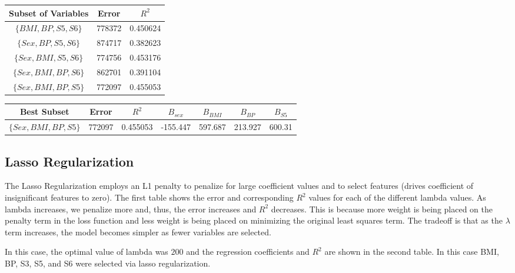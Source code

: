 \documentclass[15pt,a4paper,openright]{article}
\begin{document}
\begin{center}
 \begin{tabular}{||c | c | c||} 
 \hline
 Subset of Variables & Error & $R^2$  \\ [0.5ex] 
 \hline\hline
 $\{BMI, BP, S5, S6\}$ & 778372 & 0.450624   \\
 $\{Sex, BP, S5, S6\}$ & 874717 & 0.382623 \\
 $\{Sex, BMI, S5, S6\}$ & 774756 & 0.453176 \\
 $\{Sex, BMI, BP, S6\}$ & 862701 & 0.391104 \\
 $\{Sex, BMI, BP, S5\}$ & 772097 & 0.455053 \\
 [1ex] 
 \hline
\end{tabular}
\end{center}

\begin{center}
 \begin{tabular}{||c | c | c | c | c | c | c||} 
 \hline
 Best Subset & Error & $R^2$ & $B_{sex}$ & $B_{BMI}$ & $B_{BP}$ & $B_{S5}$ \\ [0.5ex] 
 \hline\hline
 $\{Sex, BMI, BP, S5\}$ & 772097 & 0.455053 & -155.447 & 597.687 & 213.927 & 600.31 \\
 [1ex] 
 \hline
\end{tabular}
\end{center}

\subsection{Lasso Regularization}

The Lasso Regularization employs an L1 penalty to penalize for large coefficient values and to select features (drives coefficient of insignificant features to zero). The first table shows the error and corresponding $R^2$ values for each of the different lambda values. As lambda increases, we penalize more and, thus, the error increases and $R^2$ decreases. This is because more weight is being placed on the penalty term in the loss function and less weight is being placed on minimizing the original least squares term. The tradeoff is that as the $\lambda$ term increases, the model becomes simpler as fewer variables are selected.

In this case, the optimal value of lambda was $200$ and the regression coefficients and $R^2$ are shown in the second table. In this case BMI, BP, S3, S5, and S6 were selected via lasso regularization. 
\end{document}
